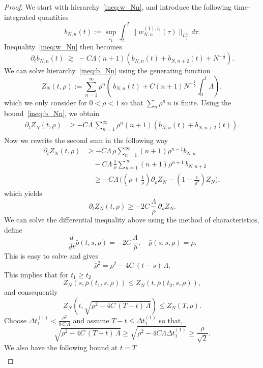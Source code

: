 \documentclass[pdflatex,sn-mathphys-num]{sn-jnl}
\theoremstyle{thmstyleone}%
\theoremstyle{thmstyletwo}%
\theoremstyle{thmstylethree}%
\begin{document}
\begin{proof}
\noindent
We start with hierarchy~\eqref{ineq:w_Nn}, and introduce the following time-integrated quantities
\[
b_{N,n}(t)
:= \sup_{i_1} \int_{t}^{T} \|w^{(1),i_1}_{N,n}(\tau)\|_{L^2_f}\,d\tau.
\]
Inequality~\eqref{ineq:w_Nn} then becomes
\begin{equation}\label{ineq:b_Nn}
\partial_t b_{N,n}(t)
\;\gtrsim\;
- C \Lambda (n+1)\left( b_{N,n}(t)+ b_{N,n+2}(t) + N^{-\frac{1}{2}} \right) .
\end{equation}
We can solve hierarchy~\eqref{ineq:b_Nn} using the generating function 
\begin{equation}\label{def:G}
Z_N(t,\rho)
:= \sum_{n=1}^{\infty} \rho^n\left(\, b_{N,n}(t)+ C(n+1) N^{-\frac{1}{2}}\int_0^t \Lambda\right),
\end{equation}
which we only consider for $0<\rho<1$ so that $\sum_n \rho^n\,n$ is finite. Using the bound~\eqref{ineq:b_Nn}, we obtain
\[
\begin{aligned}
\partial_t Z_N(t, \rho)
&\geq- C \Lambda\, \sum_{n=1}^{\infty} \rho^n(n+1) \left( b_{N,n}(t) + b_{N,n+2}(t) \right). \\
\end{aligned}
\] 
Now we rewrite the second sum in the following way
\begin{align*}
\partial_t Z_N(t,\rho)
&\geq -C \Lambda\, \rho 
\sum_{n=1}^{\infty} (n+1) \rho^{n-1}
 b_{N,n}  \\
&\quad - C \Lambda\, \frac{1}{\rho} 
\sum_{n=1}^{\infty} (n+1) \rho^{n+1}\,b_{N,n+2} \\
& \quad \geq -C \Lambda\,\bigg( ( \rho + \frac{1}{\rho} ) \partial_{\rho} Z_N -  ( 1 - \frac{1}{\rho^2} ) Z_N \bigg),
\end{align*} 
which yields
\[
\partial_t Z_N(t, \rho)
\geq -2C\, \frac{\Lambda}{\rho}\, \partial_{\rho} Z_N.
\]
We can solve the differential inequality above using the method of characteristics, define
\[
\frac{d}{dt}\bar\rho(t,s,\rho)=-2C\, \frac{\Lambda}{\bar\rho},\quad\bar\rho(s,s,\rho)=\rho.
\]
This is easy to solve and gives
\[
\bar\rho^{2}=\rho^2-4C\,(t-s)\, \Lambda.
\]
This implies that for $t_1\geq t_2$
\[
Z_{N}(s, \bar \rho(t_1,s,\rho)) \leq Z_{N}(t, \bar\rho(t_2,s,\rho)),
\] 
and consequently
\[
Z_{N}(t, \sqrt{\rho^2 - 4C\,(T-t)\, \Lambda}) \leq Z_{N}(T, \rho).
\]
Choose \( \Delta t_1^{(1)} < \frac{\rho^2}{8\,C\,\Lambda} \) and assume \( T - t \leq \Delta t_1^{(1)} \) so that, 
\[
 \sqrt{\rho^2 - 4C\,(T-t)\, \Lambda} \geq \sqrt{\rho^{2} - 4C \Lambda\Delta t_1^{(1)}}\geq \frac{\rho}{\sqrt{2}}.
 \]
We also have the following bound at $t=T$
\begin{align*}

\end{align*}
\end{proof}
\end{document}
